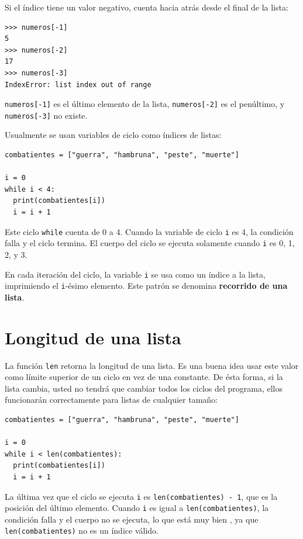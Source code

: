 Si el índice tiene un valor negativo, cuenta hacia atrás desde el
final de la lista:
\begin{verbatim}
>>> numeros[-1]
5
>>> numeros[-2]
17
>>> numeros[-3]
IndexError: list index out of range
\end{verbatim}

\texttt{numeros{[}-1{]}} es el último elemento de la lista, \texttt{numeros{[}-2{]}}
es el penúltimo, y \texttt{numeros{[}-3{]}} no existe.

Usualmente se usan variables de ciclo como índices de listas:
\begin{verbatim}
combatientes = ["guerra", "hambruna", "peste", "muerte"]

i = 0
while i < 4:
  print(combatientes[i])
  i = i + 1
\end{verbatim}

Este ciclo \texttt{while} cuenta de 0 a 4. Cuando la variable de ciclo
\texttt{i} es 4, la condición falla y el ciclo termina. El cuerpo
del ciclo se ejecuta solamente cuando \texttt{i} es 0, 1, 2, y 3.

En cada iteración del ciclo, la variable \texttt{i} se usa como un
índice a la lista, imprimiendo el \texttt{i}-ésimo elemento. Este
patrón se denomina \textbf{recorrido de una lista}.

 

\section{Longitud de una lista}

 

La función \texttt{len} retorna la longitud de una lista. Es una buena
idea usar este valor como límite superior de un ciclo en vez de una
constante. De ésta forma, si la lista cambia, usted no tendrá que
cambiar todos los ciclos del programa, ellos funcionarán correctamente
para listas de cualquier tamaño:
\begin{verbatim}
combatientes = ["guerra", "hambruna", "peste", "muerte"]

i = 0
while i < len(combatientes):
  print(combatientes[i])
  i = i + 1
\end{verbatim}

La última vez que el ciclo se ejecuta \texttt{i} es \texttt{len(combatientes)
- 1}, que es la posición del último elemento. Cuando \texttt{i} es
igual a \texttt{len(combatientes)}, la condición falla y el cuerpo
no se ejecuta, lo que está muy bien , ya que \texttt{len(combatientes)}
no es un índice válido.

